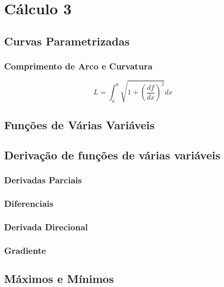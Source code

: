 \chapter{Cálculo 3}
\section{Curvas Parametrizadas}
\subsection{Comprimento de Arco e Curvatura}

\begin{equation}\label{12.1}
    L=\int_a^b \sqrt{1+\left(\frac{df}{dx}\right)^2} dx
\end{equation}
\section{Funções de Várias Variáveis}

\section{Derivação de funções de várias variáveis}

\subsection{Derivadas Parciais}
\subsection{Diferenciais}
\subsection{Derivada Direcional}
\subsection{Gradiente}

\section{Máximos e Mínimos}


